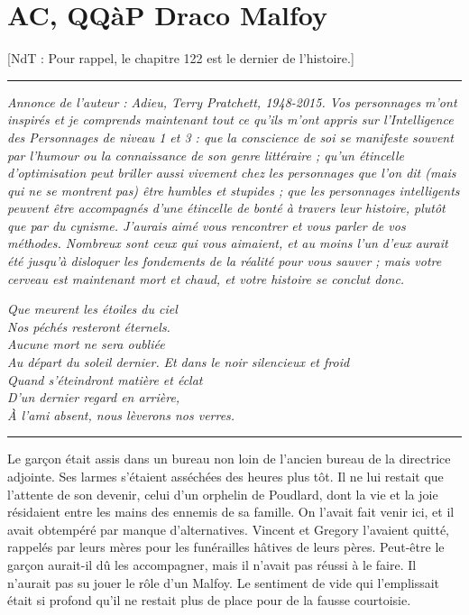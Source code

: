 
\chapter{AC, QQàP   Draco Malfoy}

[NdT : Pour rappel, le chapitre 122 est le dernier de l'histoire.]
\par\noindent\rule{\textwidth}{0.4pt}
\emph{Annonce de l'auteur : Adieu, Terry Pratchett, 1948-2015. Vos personnages m'ont inspirés et je comprends maintenant tout ce qu'ils m'ont appris sur l'Intelligence des Personnages de niveau 1 et 3 : que la conscience de soi se manifeste souvent par l'humour ou la connaissance de son genre littéraire ; qu'un étincelle d'optimisation peut briller aussi vivement chez les personnages que l'on dit (mais qui ne se montrent pas) être humbles et stupides ; que les personnages intelligents peuvent être accompagnés d'une étincelle de bonté à travers leur histoire, plutôt que par du cynisme. J'aurais aimé vous rencontrer et vous parler de vos méthodes. Nombreux sont ceux qui vous aimaient, et au moins l'un d'eux aurait été jusqu'à disloquer les fondements de la réalité pour vous sauver ; mais votre cerveau est maintenant mort et chaud, et votre histoire se conclut donc.} 

\emph{Que meurent les étoiles du ciel} \\\emph{Nos péchés resteront éternels.} \\\emph{Aucune mort ne sera oubliée} \\\emph{Au départ du soleil dernier.}  \emph{Et dans le noir silencieux et froid} \\\emph{Quand s'éteindront matière et éclat} \\\emph{D'un dernier regard en arrière,} \\\emph{À l'ami absent, nous lèverons nos verres.} 
\par\noindent\rule{\textwidth}{0.4pt}
Le garçon était assis dans un bureau non loin de l'ancien bureau de la directrice adjointe. Ses larmes s'étaient asséchées des heures plus tôt. Il ne lui restait que l'attente de son devenir, celui d'un orphelin de Poudlard, dont la vie et la joie résidaient entre les mains des ennemis de sa famille. On l'avait fait venir ici, et il avait obtempéré par manque d'alternatives. Vincent et Gregory l'avaient quitté, rappelés par leurs mères pour les funérailles hâtives de leurs pères. Peut-être le garçon aurait-il dû les accompagner, mais il n'avait pas réussi à le faire. Il n'aurait pas su jouer le rôle d'un Malfoy. Le sentiment de vide qui l'emplissait était si profond qu'il ne restait plus de place pour de la fausse courtoisie.


